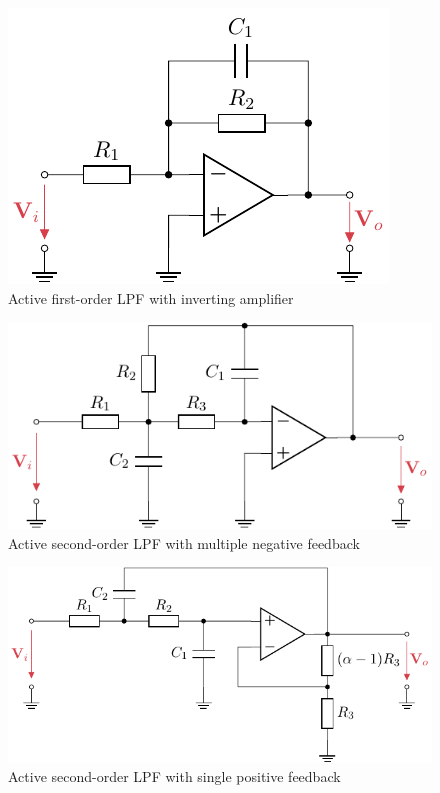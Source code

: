 \begin{figure}[!htb]
  \centering
  \includegraphics[scale=1]{figures/electronics/lowpass/lp_active_1ord_inv_amp/lp_active_1ord_inv_amp}
  \caption[Active first-order \ac{LPF} with inverting amplifier]{Active first-order \ac{LPF} with inverting amplifier%
    \label{fig:lp_active_1ord_inv_amp}}
\end{figure}

\begin{figure}[!htb]
  \centering
  \includegraphics[scale=1]{figures/electronics/lowpass/lp_active_2ord_neg/lp_active_2ord_neg}
  \caption[Active second-order \ac{LPF} with multiple negative feedback]{Active second-order \ac{LPF} with multiple negative feedback%
    \label{fig:lp_active_2ord_neg}}
\end{figure}

\begin{figure}[!htb]
  \centering
  \includegraphics[scale=1]{figures/electronics/lowpass/lp_active_2ord_pos/lp_active_2ord_pos}
  \caption[Active second-order \ac{LPF} with single positive feedback]{Active second-order \ac{LPF} with single positive feedback%
    \label{fig:lp_active_2ord_pos}}
\end{figure}

